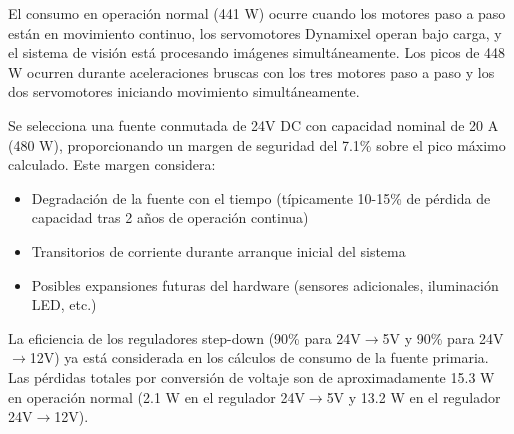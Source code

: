 El consumo en operación normal (441 W) ocurre cuando los motores paso a paso están en movimiento continuo, los servomotores Dynamixel operan bajo carga, y el sistema de visión está procesando imágenes simultáneamente. Los picos de 448 W ocurren durante aceleraciones bruscas con los tres motores paso a paso y los dos servomotores iniciando movimiento simultáneamente.

Se selecciona una fuente conmutada de 24V DC con capacidad nominal de 20 A (480 W), proporcionando un margen de seguridad del 7.1\% sobre el pico máximo calculado. Este margen considera:

\begin{itemize}[label=$\bullet$]
\item Degradación de la fuente con el tiempo (típicamente 10-15\% de pérdida de capacidad tras 2 años de operación continua)
\item Transitorios de corriente durante arranque inicial del sistema
\item Posibles expansiones futuras del hardware (sensores adicionales, iluminación LED, etc.)
\end{itemize}

La eficiencia de los reguladores step-down (90\% para 24V$\rightarrow$5V y 90\% para 24V$\rightarrow$12V) ya está considerada en los cálculos de consumo de la fuente primaria. Las pérdidas totales por conversión de voltaje son de aproximadamente 15.3 W en operación normal (2.1 W en el regulador 24V$\rightarrow$5V y 13.2 W en el regulador 24V$\rightarrow$12V).
